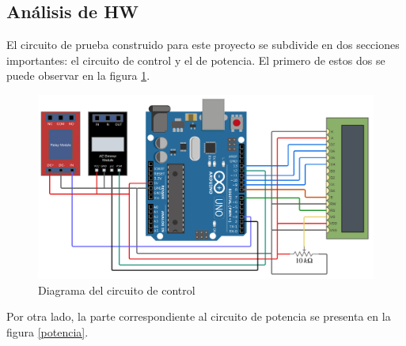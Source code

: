 \newpage
\subsection{Análisis de HW}

El circuito de prueba construido para este proyecto se subdivide en dos secciones importantes: el circuito de control y el de potencia. El primero de estos dos se puede observar en la figura \ref{circuito_control}.

\begin{figure}[H]
\centering
\includegraphics[scale=0.62]{./images/control.png} 
\caption{Diagrama del circuito de control}
\label{circuito_control}
\end{figure}

\vspace*{-0.3cm}

Por otra lado, la parte correspondiente al circuito de potencia se presenta en la figura \ref{potencia}.

